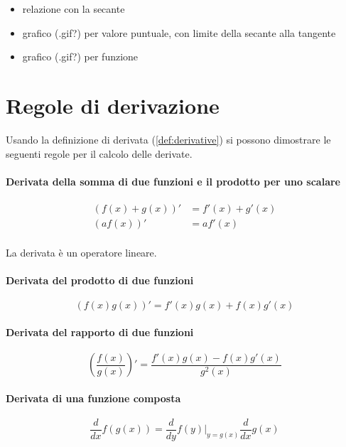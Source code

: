 {\color{red}
\begin{itemize}
    \item relazione con la secante
    \item grafico (.gif?) per valore puntuale, con limite della secante alla tangente
    \item grafico (.gif?) per funzione
\end{itemize}
}

\section{Regole di derivazione}
Usando la definizione di derivata (\ref{def:derivative}) si possono dimostrare le seguenti regole per il calcolo delle derivate.
\paragraph{Derivata della somma di due funzioni e il prodotto per uno scalare}
\begin{equation}
\begin{aligned}
    (f(x) + g(x))' & = f'(x) + g'(x) \\
    (a f(x))' & = a f'(x) \\
\end{aligned}
\end{equation}
\begin{property} La derivata è un operatore lineare.
\end{property}

\paragraph{Derivata del prodotto di due funzioni}
\begin{equation}
    (f(x) g(x))' = f'(x) g(x) + f(x) g'(x)
\end{equation}
\paragraph{Derivata del rapporto di due funzioni}
\begin{equation}
    \left( \dfrac{f(x)}{g(x)} \right)' = \dfrac{f'(x)g(x) - f(x)g'(x)}{g^2(x)}
\end{equation}
\paragraph{Derivata di una funzione composta}
\begin{equation}
    \dfrac{d}{dx} f(g(x)) = \dfrac{d}{dy} f(y) \bigg|_{y=g(x)} \dfrac{d}{dx} g(x)
\end{equation}

